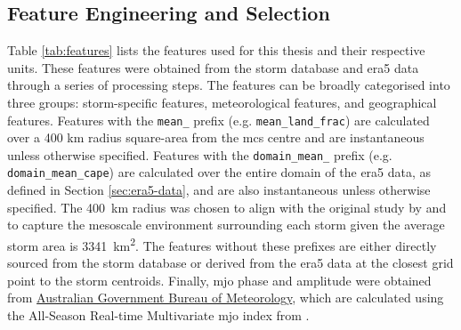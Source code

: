 \subsection{Feature Engineering and Selection}

Table \ref{tab:features} lists the features used for this thesis and their respective units. These features were obtained from the \cite{Hill2023} storm database and \acrshort{era5} data through a series of processing steps. The features can be broadly categorised into three groups: storm-specific features, meteorological features, and geographical features. Features with the \texttt{mean\_} prefix (e.g. \texttt{mean\_land\_frac}) are calculated over a 400 km radius square-area from the \acrshort{mcs} centre and are instantaneous unless otherwise specified. Features with the \texttt{domain\_mean\_} prefix (e.g. \texttt{domain\_mean\_cape}) are calculated over the entire domain of the \acrshort{era5} data, as defined in Section \ref{sec:era5-data}, and are also instantaneous unless otherwise specified. The \SI{400}{\km} radius was chosen to align with the original study by \cite{Hunt2024} and to capture the mesoscale environment surrounding each storm given the average storm area is \SI{3341}{\km\squared}. The features without these prefixes are either directly sourced from the storm database or derived from the \acrshort{era5} data at the closest grid point to the storm centroids. Finally, \acrfull{mjo} phase and amplitude were obtained from \href{https://www.bom.gov.au/climate/mjo/}{Australian Government Bureau of Meteorology}, which are calculated using the All-Season Real-time Multivariate \acrshort{mjo} index from \cite{Wheeler2004}.

